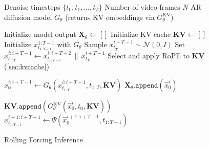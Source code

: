 
\begin{figure}
\vspace{-2em}
\begin{minipage}[t]{0.48\textwidth}
  \begin{algorithm}[H]
    \caption{Rolling Forcing Inference}
    \small
    \begin{algorithmic}[1]
      \Require Denoise timesteps $\{t_0, t_1, \dots, t_T\}$
      \Require Number of video frames $N$
      \Require AR diffusion model $G_\theta$ (returns KV embeddings via $G_\theta^{\mathrm{KV}}$)

        \State Initialize model output $\mathbf{X}_{\theta} \gets []$
        \State Initialize KV cache $\mathbf{KV} \gets []$
        \State Initialize $x^{1:T-1}_{t_{1:T-1}}$ with $G_\theta$
          \State Sample $x_{t_T}^{i+T-1} \sim \mathcal{N}(0, I)$
          \State Set $x^{i:i+T-1}_{t_{1:T}} \gets x^{i:i+T-2}_{t_{1:T-1}} \,\|\, x_{t_T}^{i+T-1}  $
          \State Select and apply RoPE to $\mathbf{KV}$ (\cref{sec:kvcache})


          \State $\hat{x}^{i:i+T-1}_0 \gets G_\theta(x^{i:i+T-1}_{t_{1:T}}, t_{1:T},  \mathbf{KV})$
          \State $\mathbf{X}_{\theta}{\texttt{.append}}( \hat{x}^{i}_0)$

          
          \State $\mathbf{KV}{\texttt{.append}}( G_\theta^\text{KV}(\hat{x}^i_{0}, t_0, \mathbf{KV}))$
          \State $x^{i+1:i+T-1}_{t_{1:T-1}} \gets \Psi(\hat{x}^{i+1:i+T-1}_0, t_{1:T-1}) $
        \EndFor


    \end{algorithmic}
    \label{alg:inference}
  \end{algorithm}
\end{minipage}
\vspace{-2em}
\end{figure}





